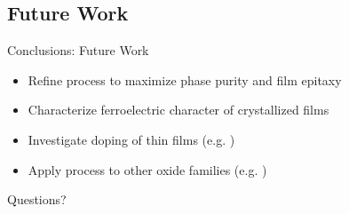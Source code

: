 \documentclass[professionalfont]{beamer}
\begin{document}
\subsection{Future Work}
\begin{frame}{Conclusions: Future Work}
\begin{itemize}
\item Refine process to maximize phase purity and film epitaxy
\vspace{2em}
\item Characterize ferroelectric character of crystallized films
\vspace{2em}
\item Investigate doping of thin films (e.g. )
\vspace{2em}
\item Apply process to other oxide families (e.g. )
\end{itemize}
\end{frame}


\begin{frame}
	\vfill
	\begin{center}
		{\Huge Questions?}
	\end{center}
\end{frame}
\end{document}
